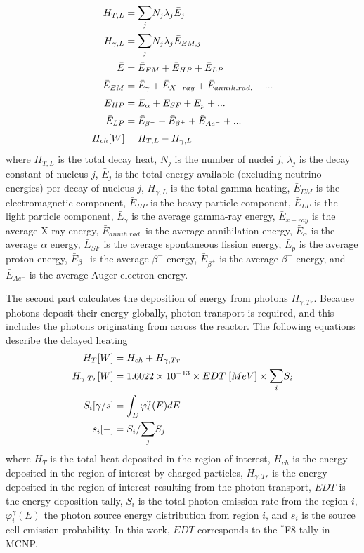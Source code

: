 \begin{align}
H_{T, L} &= \mathlarger{\sum}_j N_j \lambda_j \bar{E}_j \\
H_{\gamma, L} &= \mathlarger{\sum}_j N_j \lambda_j \bar{E}_{EM, j} \\
\bar{E} &= \bar{E}_{EM} + \bar{E}_{HP} + \bar{E}_{LP} \\
\bar{E}_{EM} &= \bar{E}_{\gamma} + \bar{E}_{X-ray} + \bar{E}_{annih.rad.} + ... \\
\bar{E}_{HP} &= \bar{E}_{\alpha} + \bar{E}_{SF} + \bar{E}_{p} + ... \\
\bar{E}_{LP} &= \bar{E}_{\beta^-} + \bar{E}_{\beta^+} + \bar{E}_{Ae^-} + ... \\
H_{ch} [W] &= H_{T, L} - H_{\gamma, L}
\end{align}
where $H_{T, L}$ is the total decay heat, $N_j$ is the number of nuclei $j$, $\lambda_j$ is the decay constant of nucleus $j$, $\bar{E}_j$ is the total energy available (excluding neutrino energies) per decay of nucleus $j$, $H_{\gamma, L}$ is the total gamma heating, $\bar{E}_{EM}$ is the electromagnetic component, $\bar{E}_{HP}$ is the heavy particle component, $\bar{E}_{LP}$ is the light particle component, $\bar{E}_{\gamma}$ is the average gamma-ray energy, $\bar{E}_{x-ray}$ is the average X-ray energy, $\bar{E}_{annih.rad.}$ is the average annihilation energy, $\bar{E}_{\alpha}$ is the average $\alpha$ energy, $\bar{E}_{SF}$ is the average spontaneous fission energy, $\bar{E}_{p}$ is the average proton energy, $\bar{E}_{\beta^-}$ is the average $\beta^-$ energy, $\bar{E}_{\beta^+}$ is the average $\beta^+$ energy, and $\bar{E}_{Ae^-}$ is the average Auger-electron energy.

The second part calculates the deposition of energy from photons $H_{\gamma, Tr}$.
Because photons deposit their energy globally, photon transport is required, and this includes the photons originating from across the reactor.
The following equations describe the delayed heating
\begin{align}
H_{T} [W] &= H_{ch} + H_{\gamma, Tr}  \label{eq-heat} \\
H_{\gamma, Tr} [W] &= 1.6022 \times 10^{-13} \times EDT \; [MeV] \times \mathlarger{\sum}_i S_i \label{eq-ga-tr} \\
S_i[\gamma/s] &= \int_{E} \varphi^\gamma_i(E) dE \\
s_i [-] &= S_i / \mathlarger{\sum}_j S_j \label{eq-emiprob}
\end{align}
where $H_{T}$ is the total heat deposited in the region of interest, $H_{ch}$ is the energy deposited in the region of interest by charged particles, $H_{\gamma, Tr}$ is the energy deposited in the region of interest resulting from the photon transport, $EDT$ is the energy deposition tally, $S_i$ is the total photon emission rate from the region $i$, $\varphi^\gamma_i(E)$ the photon source energy distribution from region $i$, and $s_i$ is the source cell emission probability.
In this work, $EDT$ corresponds to the $^\ast$F8 tally in MCNP.

